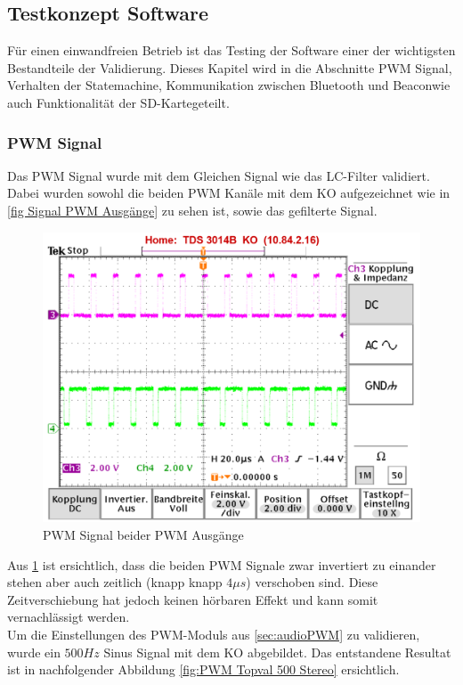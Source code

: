 \subsection{Testkonzept Software}\label{sec:testkonzeptSoftware}

Für einen einwandfreien Betrieb ist das Testing der Software einer der wichtigsten Bestandteile der Validierung. Dieses Kapitel wird in die Abschnitte \glqq PWM Signal\grqq, \glqq Verhalten der Statemachine\grqq, \glqq Kommunikation zwischen Bluetooth und Beacon\grqq wie auch \glqq Funktionalität der SD-Karte\grqq geteilt.

\subsubsection{PWM Signal}\label{sec: Validierung PWM Signal}

Das PWM Signal wurde mit dem Gleichen Signal wie das LC-Filter validiert. Dabei wurden sowohl die beiden PWM Kanäle mit dem KO aufgezeichnet wie in \ref{fig Signal PWM Ausgänge} zu sehen ist, sowie das gefilterte Signal. 

\begin{figure}[H]
	\begin{center}
		\includegraphics[width=120mm]{data/PWM_Signal_500Hz_Mono_mit_Infos.png}
		\caption[PWM Signal beider PWM Ausgänge]{PWM Signal beider PWM Ausgänge} %
		\label{fig:Signal PWM Ausgänge}
	\end{center}
\end{figure}


Aus \ref{fig:Signal PWM Ausgänge} ist ersichtlich, dass die beiden PWM Signale zwar invertiert zu einander stehen aber auch zeitlich (knapp knapp $4\mu s$) verschoben sind. Diese Zeitverschiebung hat jedoch keinen hörbaren Effekt und kann somit vernachlässigt werden.\\
Um die Einstellungen des PWM-Moduls aus \ref{sec:audioPWM} zu validieren, wurde ein $500Hz$ Sinus Signal mit dem KO abgebildet. Das entstandene Resultat ist in nachfolgender Abbildung \ref{fig:PWM Topval 500 Stereo} ersichtlich.

